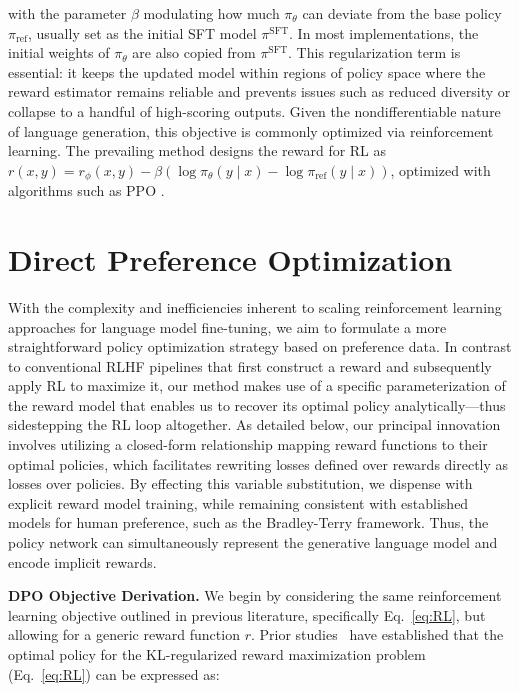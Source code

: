 with the parameter $\beta$ modulating how much $\pi_{\theta}$ can deviate from the base policy $\pi_\text{ref}$, usually set as the initial SFT model $\pi^\text{SFT}$. In most implementations, the initial weights of $\pi_\theta$ are also copied from $\pi^\text{SFT}$. This regularization term is essential: it keeps the updated model within regions of policy space where the reward estimator remains reliable and prevents issues such as reduced diversity or collapse to a handful of high-scoring outputs. Given the nondifferentiable nature of language generation, this objective is commonly optimized via reinforcement learning. The prevailing method \citep{ziegler2020finetuning, stiennon2022learning, bai2022training, ouyang2022training} designs the reward for RL as ${r(x, y) = r_{\phi}(x, y) -\beta (\log \pi_{\theta}(y\mid x) - \log \pi_\text{ref}(y\mid x))}$, optimized with algorithms such as PPO \cite{schulman2017proximal}.

\section{Direct Preference Optimization}\label{sec:DPO}

With the complexity and inefficiencies inherent to scaling reinforcement learning approaches for language model fine-tuning, we aim to formulate a more straightforward policy optimization strategy based on preference data. In contrast to conventional RLHF pipelines that first construct a reward and subsequently apply RL to maximize it, our method makes use of a specific parameterization of the reward model that enables us to recover its optimal policy analytically—thus sidestepping the RL loop altogether. As detailed below, our principal innovation involves utilizing a closed-form relationship mapping reward functions to their optimal policies, which facilitates rewriting losses defined over rewards directly as losses over policies. By effecting this variable substitution, we dispense with explicit reward model training, while remaining consistent with established models for human preference, such as the Bradley-Terry framework. Thus, the policy network can simultaneously represent the generative language model and encode implicit rewards.

\textbf{DPO Objective Derivation.} We begin by considering the same reinforcement learning objective outlined in previous literature, specifically Eq.~\ref{eq:RL}, but allowing for a generic reward function $r$. Prior studies~\citep{peters2007reinforcement, peng2019advantage, korbak2022reinforcement, go2023aligning} have established that the optimal policy for the KL-regularized reward maximization problem (Eq.~\ref{eq:RL}) can be expressed as:

